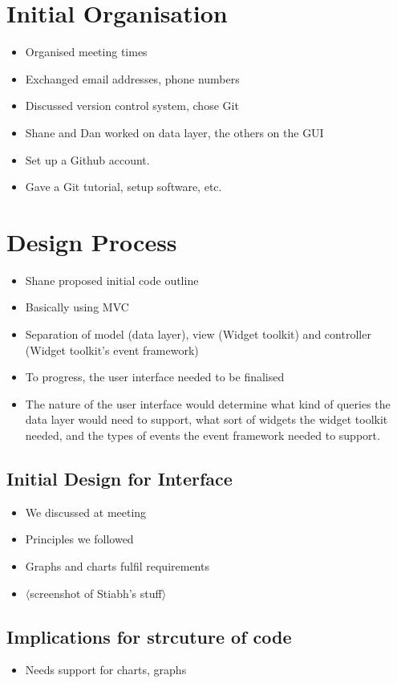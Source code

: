 \section{Initial Organisation}
\begin{itemize}
\item Organised meeting times
\item Exchanged email addresses, phone numbers
\item Discussed version control system, chose Git
\item Shane and Dan worked on data layer, the others on the GUI
\item Set up a Github account.\cite{github}
\item Gave a Git tutorial, setup software, etc.
\end{itemize}

\section{Design Process}
\begin{itemize}
\item Shane proposed initial code outline
\item Basically using MVC\cite{mvc}
\item Separation of model (data layer), view (Widget toolkit) and controller (Widget toolkit's event framework)
\item To progress, the user interface needed to be finalised
\item The nature of the user interface would determine what kind of queries the data layer would need to support, what sort of widgets the widget toolkit needed, and the types of events the event framework needed to support.
\end{itemize}

\subsection{Initial Design for Interface}
\begin{itemize}
\item We discussed at meeting
\item Principles we followed
\item Graphs and charts fulfil requirements
\item $\langle$screenshot of Stiabh's stuff$\rangle$
\end{itemize}
\subsection{Implications for strcuture of code}
\begin{itemize}
\item Needs support for charts, graphs
\end{itemize}

